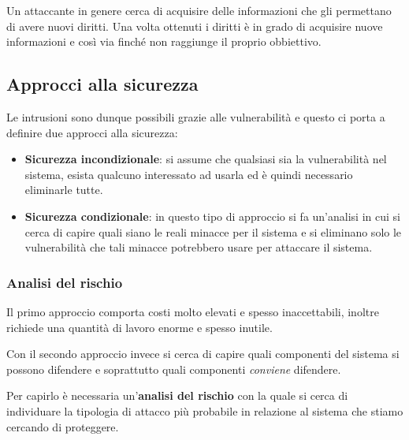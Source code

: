 Un attaccante in genere cerca di acquisire delle informazioni che gli permettano di avere nuovi diritti. Una volta
ottenuti i diritti è in grado di acquisire nuove informazioni e così via finché non raggiunge il proprio obbiettivo.

\subsection{Approcci alla sicurezza}
Le intrusioni sono dunque possibili grazie alle vulnerabilità e questo ci porta a definire due approcci alla sicurezza:
\begin{itemize}
	\item \textbf{Sicurezza incondizionale}: si assume che qualsiasi sia la vulnerabilità nel sistema, esista qualcuno
	      interessato ad usarla ed è quindi necessario eliminarle tutte.
	\item \textbf{Sicurezza condizionale}: in questo tipo di approccio si fa un'analisi in cui si cerca di capire quali
	      siano le reali minacce per il sistema e si eliminano solo le vulnerabilità che tali minacce potrebbero usare
	      per attaccare il sistema.
\end{itemize}

\subsubsection{Analisi del rischio}
Il primo approccio comporta costi molto elevati e spesso inaccettabili, inoltre richiede una quantità di lavoro enorme
e spesso inutile.

Con il secondo approccio invece si cerca di capire quali componenti del sistema si possono difendere e soprattutto
quali componenti \emph{conviene} difendere.

Per capirlo è necessaria un'\textbf{analisi del rischio} con la quale si cerca di individuare la tipologia di attacco
più probabile in relazione al sistema che stiamo cercando di proteggere.